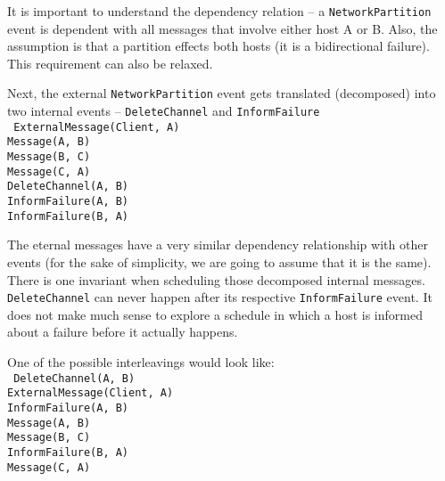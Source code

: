 \documentclass[DIV=calc, paper=a4, fontsize=11pt, twocolumn]{scrartcl}   %
\begin{document}
It is important to understand the dependency relation -- a {\tt NetworkPartition} event is dependent with all messages that involve either host A or B.  Also, the assumption is that a partition effects both hosts (it is a bidirectional failure). This requirement can also be relaxed.  

Next, the external {\tt NetworkPartition} event gets translated (decomposed) into two internal events -- {\tt DeleteChannel} and {\tt InformFailure}\\

\noindent
{\tt
ExternalMessage(Client, A)\\
Message(A, B)\\
Message(B, C)\\
Message(C, A)\\
DeleteChannel(A, B)\\
InformFailure(A, B)\\
InformFailure(B, A)\\
}

The eternal messages have a very similar dependency relationship with other events (for the sake of simplicity, we are going to assume that it is the same).  There is one invariant when scheduling those decomposed internal messages.  {\tt DeleteChannel} can never happen after its respective {\tt InformFailure} event.  It does not make much sense to explore a schedule in which a host is informed about a failure before it actually happens.

One of the possible interleavings would look like:\\

\noindent
{\tt
DeleteChannel(A, B)\\
ExternalMessage(Client, A)\\
InformFailure(A, B)\\
Message(A, B)\\
Message(B, C)\\
InformFailure(B, A)\\
Message(C, A)\\
}
\end{document}
